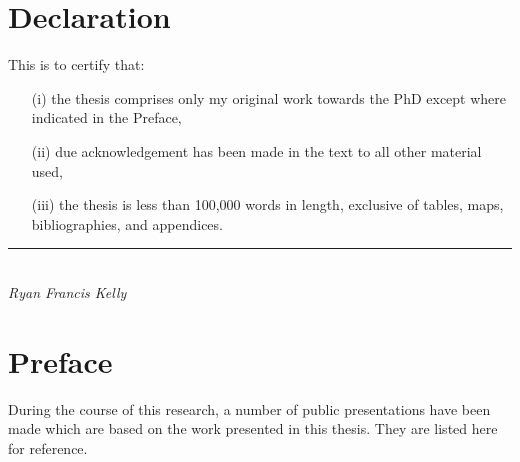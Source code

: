 \begin{titlepage}
\begin{center}
\end{center}
\end{titlepage}

\cleardoublepage
{}



\chapter*{Declaration}
This is to certify that:
\begin{itemize}
\item[(i)] the thesis comprises only my original work towards the PhD except where indicated in the Preface,
\item[(ii)] due acknowledgement has been made in the text to all other material used,
\item[(iii)] the thesis is less than 100,000 words in length, exclusive of tables, maps, bibliographies, and appendices.
\end{itemize}
\vspace{3cm}
\rule{70mm}{0.1mm}\\
\emph{Ryan Francis Kelly}

\chapter*{Preface}
During the course of this research, a number of public presentations have been
 made which are based on the work presented in this thesis. They are listed
 here for reference.

